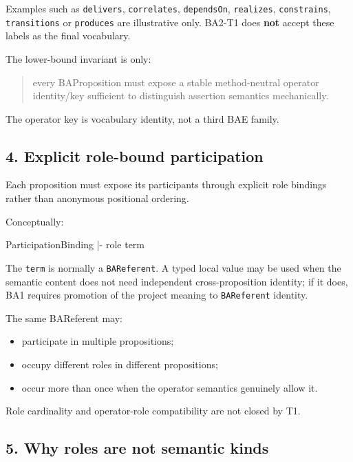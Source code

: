 \documentclass[
  10pt,
  letterpaper,
]{article}
\newenvironment{Shaded}{}{}
\newcommand{\NormalTok}[1]{#1}
\providecommand{\tightlist}{%
  \setlength{\itemsep}{0pt}\setlength{\parskip}{0pt}}
\begin{document}
Examples such as \texttt{delivers}, \texttt{correlates},
\texttt{dependsOn}, \texttt{realizes}, \texttt{constrains},
\texttt{transitions} or \texttt{produces} are illustrative only. BA2-T1
does \textbf{not} accept these labels as the final vocabulary.

The lower-bound invariant is only:

\begin{quote}
every BAProposition must expose a stable method-neutral operator
identity/key sufficient to distinguish assertion semantics mechanically.
\end{quote}

The operator key is vocabulary identity, not a third BAE family.

\subsection{4. Explicit role-bound
participation}\label{explicit-role-bound-participation}

Each proposition must expose its participants through explicit role
bindings rather than anonymous positional ordering.

Conceptually:

\begin{Shaded}
\begin{Highlighting}[]
\NormalTok{ParticipationBinding}
\NormalTok{|{-} role}
\NormalTok{\textasciigrave{}{-} term}
\end{Highlighting}
\end{Shaded}

The \texttt{term} is normally a \texttt{BAReferent}. A typed local value
may be used when the semantic content does not need independent
cross-proposition identity; if it does, BA1 requires promotion of the
project meaning to \texttt{BAReferent} identity.

The same BAReferent may:

\begin{itemize}
\tightlist
\item
  participate in multiple propositions;
\item
  occupy different roles in different propositions;
\item
  occur more than once when the operator semantics genuinely allow it.
\end{itemize}

Role cardinality and operator-role compatibility are not closed by T1.

\subsection{5. Why roles are not semantic
kinds}\label{why-roles-are-not-semantic-kinds}
\end{document}
